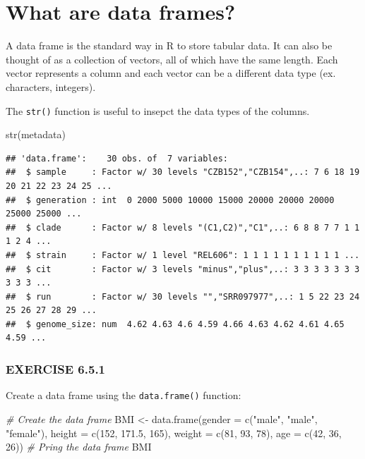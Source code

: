 \documentclass[
]{book}
\newenvironment{Shaded}{\begin{snugshade}}{\end{snugshade}}
\newcommand{\AttributeTok}[1]{\textcolor[rgb]{0.77,0.63,0.00}{#1}}
\newcommand{\CommentTok}[1]{\textcolor[rgb]{0.56,0.35,0.01}{\textit{#1}}}
\newcommand{\DecValTok}[1]{\textcolor[rgb]{0.00,0.00,0.81}{#1}}
\newcommand{\FloatTok}[1]{\textcolor[rgb]{0.00,0.00,0.81}{#1}}
\newcommand{\FunctionTok}[1]{\textcolor[rgb]{0.00,0.00,0.00}{#1}}
\newcommand{\NormalTok}[1]{#1}
\newcommand{\OtherTok}[1]{\textcolor[rgb]{0.56,0.35,0.01}{#1}}
\newcommand{\StringTok}[1]{\textcolor[rgb]{0.31,0.60,0.02}{#1}}
\begin{document}
\hypertarget{what-are-data-frames}{%
\section{What are data frames?}\label{what-are-data-frames}}

A data frame is the standard way in R to store tabular data. It can also be thought of as a collection of vectors, all of which have the same length. Each vector represents a column and each vector can be a different data type (ex. characters, integers).

The \texttt{str()} function is useful to insepct the data types of the columns.

\begin{Shaded}
\begin{Highlighting}[]
\FunctionTok{str}\NormalTok{(metadata)}
\end{Highlighting}
\end{Shaded}

\begin{verbatim}
## 'data.frame':    30 obs. of  7 variables:
##  $ sample     : Factor w/ 30 levels "CZB152","CZB154",..: 7 6 18 19 20 21 22 23 24 25 ...
##  $ generation : int  0 2000 5000 10000 15000 20000 20000 20000 25000 25000 ...
##  $ clade      : Factor w/ 8 levels "(C1,C2)","C1",..: 6 8 8 7 7 1 1 1 2 4 ...
##  $ strain     : Factor w/ 1 level "REL606": 1 1 1 1 1 1 1 1 1 1 ...
##  $ cit        : Factor w/ 3 levels "minus","plus",..: 3 3 3 3 3 3 3 3 3 3 ...
##  $ run        : Factor w/ 30 levels "","SRR097977",..: 1 5 22 23 24 25 26 27 28 29 ...
##  $ genome_size: num  4.62 4.63 4.6 4.59 4.66 4.63 4.62 4.61 4.65 4.59 ...
\end{verbatim}

\hypertarget{exercise-6.5.1}{%
\subsubsection*{EXERCISE 6.5.1}\label{exercise-6.5.1}}

Create a data frame using the \texttt{data.frame()} function:

\begin{Shaded}
\begin{Highlighting}[]
\CommentTok{\# Create the data frame}
\NormalTok{BMI }\OtherTok{\textless{}{-}} \FunctionTok{data.frame}\NormalTok{(}\AttributeTok{gender =} \FunctionTok{c}\NormalTok{(}\StringTok{"male"}\NormalTok{, }\StringTok{"male"}\NormalTok{, }\StringTok{"female"}\NormalTok{), }\AttributeTok{height =} \FunctionTok{c}\NormalTok{(}\DecValTok{152}\NormalTok{, }\FloatTok{171.5}\NormalTok{, }\DecValTok{165}\NormalTok{), }\AttributeTok{weight =} \FunctionTok{c}\NormalTok{(}\DecValTok{81}\NormalTok{, }\DecValTok{93}\NormalTok{, }\DecValTok{78}\NormalTok{), }\AttributeTok{age =} \FunctionTok{c}\NormalTok{(}\DecValTok{42}\NormalTok{, }\DecValTok{36}\NormalTok{, }\DecValTok{26}\NormalTok{))}
\CommentTok{\# Pring the data frame}
\NormalTok{BMI}
\end{Highlighting}
\end{Shaded}
\end{document}
